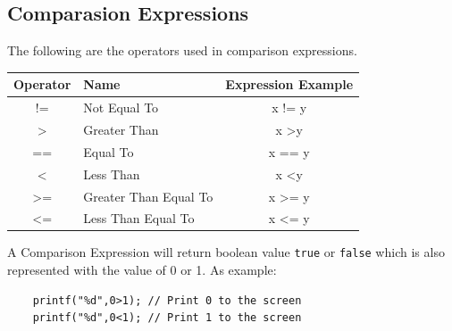 \subsection{Comparasion Expressions}
The following are the operators used in comparison expressions.
\begin{center}
	\begin{tabular}{|c|l|c|}
		\hline
		\textbf{Operator} & \textbf{Name}         & \multicolumn{1}{l|}{\textbf{Expression Example}} \\ \hline
		!=                & Not Equal To          & x != y                                           \\ \hline
		\textgreater{}    & Greater Than          & x \textgreater y                                 \\ \hline
		==                & Equal To              & x == y                                           \\ \hline
		\textless{}       & Less Than             & x \textless y                                    \\ \hline
		\textgreater{}=   & Greater Than Equal To & x \textgreater{}= y                              \\ \hline
		\textless{}=      & Less Than Equal To    & x \textless{}= y                                 \\ \hline
	\end{tabular}
\end{center}

A Comparison Expression will return boolean value \verb|true| or \verb|false| which is also represented with the value of 0 or 1.
As example:
\begin{verbatim}
    printf("%d",0>1); // Print 0 to the screen
    printf("%d",0<1); // Print 1 to the screen
\end{verbatim}

